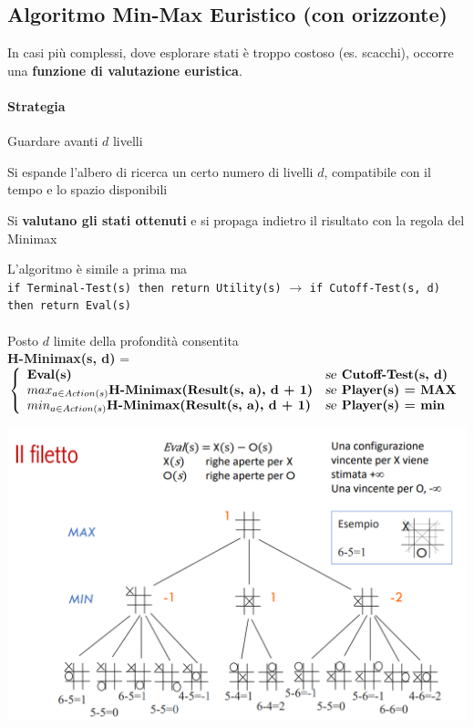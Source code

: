 \documentclass[10pt]{book}
\begin{document}
\subsection{Algoritmo Min-Max Euristico (con orizzonte)}
In casi più complessi, dove esplorare stati è troppo costoso (es. scacchi), occorre una \textbf{funzione di valutazione euristica}.
\paragraph{Strategia} Guardare avanti $d$ livelli
\begin{list}{}{}
	\item Si espande l'albero di ricerca un certo numero di livelli $d$, compatibile con il tempo e lo spazio disponibili
	\item Si \textbf{valutano gli stati ottenuti} e si propaga indietro il risultato con la regola del Minimax
\end{list}
L'algoritmo è simile a prima ma\\
\texttt{if Terminal-Test(s) then return Utility(s)} $\rightarrow$ \texttt{if Cutoff-Test(s, d) then return Eval(s)}\\\\
Posto $d$ limite della profondità consentita\\
\textbf{H-Minimax(s, d)} = 
\begin{math}
\left\{
\begin{array}{l l}
	\textbf{Eval(s)} & \textsl{se}\:\:\textbf{Cutoff-Test(s, d)}\\
	max_{a \in Action(s)} \textbf{H-Minimax(Result(s, a), d + 1)} & \textsl{se}\:\: \textbf{Player(s) = MAX}\\
	min_{a \in Action(s)} \textbf{H-Minimax(Result(s, a), d + 1)} & \textsl{se}\:\: \textbf{Player(s) = min}
\end{array}
\right.
\end{math}
\begin{center}
	\includegraphics[scale=0.5]{hminmax_tictactoe.png}
\end{center}
\end{document}
